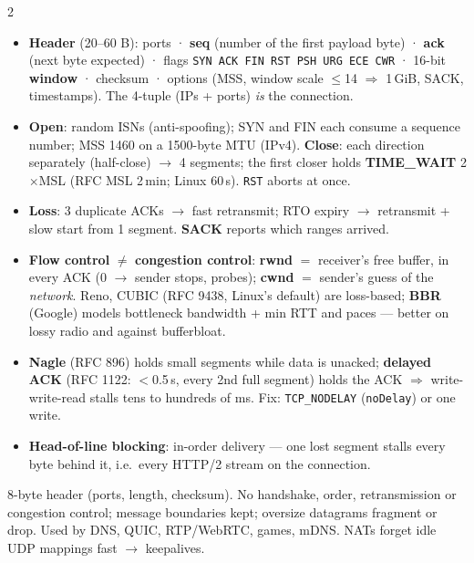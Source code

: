 \documentclass[8pt]{extarticle}
\newcommand\ct[1]{\texttt{#1}}
\newcommand\hd[1]{\par\vspace{3pt}\noindent{\bfseries\color{sheetBlue}#1}\par\vspace{1pt}}
\begin{document}
\begin{multicols}{2}
\raggedright{}

\hd{TCP}
\begin{itemize}
  \item \textbf{Header} (20–60 B): ports · \textbf{seq} (number of the first payload byte) ·
        \textbf{ack} (next byte expected) · flags \ct{SYN ACK FIN RST PSH URG ECE CWR} · 16-bit
        \textbf{window} · checksum · options (MSS, window scale $\leq$14 $\Rightarrow$ 1\,GiB, SACK,
        timestamps). The 4-tuple (IPs + ports) \emph{is} the connection.
  \item \textbf{Open}: random ISNs (anti-spoofing); SYN and FIN each consume a sequence number;
        MSS 1460 on a 1500-byte MTU (IPv4). \textbf{Close}: each direction separately (half-close)
        $\to$ 4 segments; the first closer holds \textbf{TIME\_WAIT} 2$\times$MSL (RFC MSL 2\,min;
        Linux 60\,s). \ct{RST} aborts at once.
  \item \textbf{Loss}: 3 duplicate ACKs $\to$ fast retransmit; RTO expiry $\to$ retransmit + slow
        start from 1 segment. \textbf{SACK} reports which ranges arrived.
  \item \textbf{Flow control} $\neq$ \textbf{congestion control}: \textbf{rwnd} $=$ receiver's free
        buffer, in every ACK (0 $\to$ sender stops, probes); \textbf{cwnd} $=$ sender's guess of the
        \emph{network}. Reno, CUBIC (RFC 9438, Linux's default) are loss-based; \textbf{BBR}
        (Google) models bottleneck bandwidth + min RTT and paces — better on lossy radio and
        against bufferbloat.
  \item \textbf{Nagle} (RFC 896) holds small segments while data is unacked; \textbf{delayed ACK}
        (RFC 1122: $<$0.5\,s, every 2nd full segment) holds the ACK $\Rightarrow$ write-write-read
        stalls tens to hundreds of ms. Fix: \ct{TCP\_NODELAY} (\ct{noDelay}) or one write.
  \item \textbf{Head-of-line blocking}: in-order delivery — one lost segment stalls every byte
        behind it, i.e.\ every HTTP/2 stream on the connection.
\end{itemize}

\hd{UDP — what you do \emph{not} get}
8-byte header (ports, length, checksum). No handshake, order, retransmission or congestion
control; message boundaries kept; oversize datagrams fragment or drop. Used by DNS, QUIC,
RTP/WebRTC, games, mDNS. NATs forget idle UDP mappings fast $\to$ keepalives.


\end{multicols}
\end{document}
